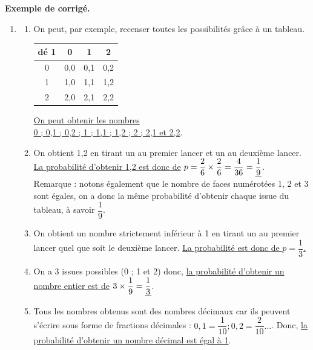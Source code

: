 \begin{activite}
   \textcolor{G1}{
   {\bf Exemple de corrigé.} \smallskip
      \begin{enumerate}
         \item 
            \begin{enumerate}
               \item On peut, par exemple, recenser toutes les possibilités grâce à un tableau. \\ [1mm]
                  {
                  \begin{tabular}{|C{1.25}|C{1.25}|C{1.25}|C{1.25}|}
                     \hline
                     {\footnotesize dé 1} & 0 & 1 & 2 \\
                      & 0,0 & 0,1 & 0,2 \\
                      & 1,0 & 1,1 & 1,2 \\
                      & 2,0 & 2,1 & 2,2 \\
                     \hline
                  \end{tabular}}
                  \qquad
                  \parbox{8cm}{\uline{On peut obtenir les nombres \\0 ; 0,1 ; 0,2 ; 1 ; 1,1 ; 1,2 ; 2 ; 2,1 et 2,2}.} \smallskip
               \item On obtient 1,2 en tirant un  \fg{} au premier lancer et un  \fg{} au deuxième lancer. \\ [1mm]
                  \uline{La probabilité d'obtenir 1,2 est donc de} $p =\dfrac26\times\dfrac26 =\dfrac4{36} =\uline{\dfrac19}$. \\ [1mm]
                  Remarque : notons également que le nombre de faces numérotées 1, 2 et 3 sont égales, on a donc la même probabilité d'obtenir chaque issue du tableau, à savoir $\dfrac19$. \smallskip
               \item On obtient un nombre strictement inférieur à 1 en tirant un  \fg{} au premier lancer quel que soit le deuxième lancer. \uline{La probabilité est donc de $p =\dfrac13$.}
               \item On a 3 issues possibles (0 ; 1 et 2) donc, \uline{la probabilité d'obtenir un nombre entier est de} $3\times\dfrac19 =\uline{\dfrac13}$. \smallskip
               \item Tous les nombres obtenus sont des nombres décimaux car ils peuvent s'écrire sous forme de fractions décimales : $0,1 =\dfrac{1}{10} ; 0,2 =\dfrac{2}{10}\dots$. Donc, \uline{la probabilité d'obtenir un nombre décimal est égal à 1}. \smallskip

\end{enumerate}
\end{enumerate}}
\end{activite}
